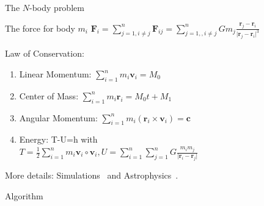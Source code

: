 \documentclass[12pt,t]{beamer}
\begin{document}
\begin{frame}{The $N$-body problem}

\begin{block}{The force for body $m_i$}
$\mathbf{F}_i = \sum\limits_{j=1,i\neq j}^n \mathbf{F}_{ij} = \sum\limits_{j=1,,i\neq j}^n G  m_j \frac{\mathbf{r}_j - \mathbf{r}_i}{\vert \mathbf{r}_j - \mathbf{r}_i\vert^3} $
\end{block}

\begin{block}{Law of Conservation:}
\begin{enumerate}
\item Linear Momentum: $\sum\limits_{i=1}^n m_i \mathbf{v}_i = M_0$
\item Center of Mass: $\sum\limits_{i=1}^n m_i \mathbf{r}_i = M_0 t + M_1$
\item Angular Momentum: $\sum\limits_{i=1}^n m_i (\mathbf{r}_i \times \mathbf{v}_i) = \mathbf{c}$
\item Energy: T-U=h with \\
$ T = \frac{1}{2} \sum\limits_{i=1}^n m_i \mathbf{v}_i \circ \mathbf{v}_i  , U= \sum\limits_{i=1}^n \sum\limits_{j=1}^n G \frac{m_i m_j}{\vert\mathbf{r}_i - \mathbf{r}_j\vert} $
\end{enumerate}
\end{block}
More details: Simulations~\cite{aarseth2003gravitational} and Astrophysics~\cite{aarseth2008cambridge}.
\end{frame}

\begin{frame}{Algorithm}

\begin{figure}
\end{figure}

\end{frame}
\end{document}
